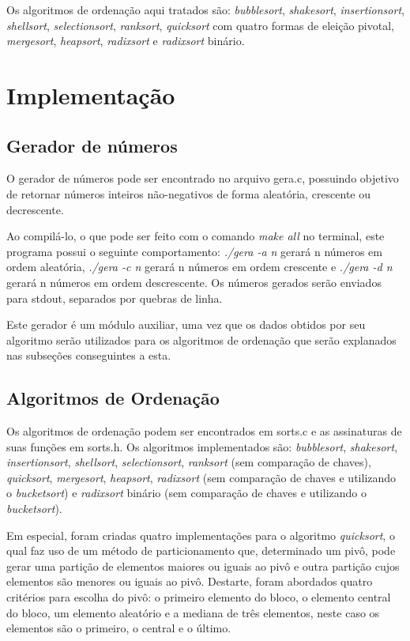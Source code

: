 \documentclass[
	article,			%
	11pt,				%
	oneside,			%
	a4paper,			%
	english,			%
	brazil,				%
	sumario=tradicional
	]{abntex2}
\begin{document}
Os algoritmos de ordenação aqui tratados são: \emph{bubblesort}, \emph{shakesort}, \emph{insertionsort}, \emph{shellsort}, \emph{selectionsort}, \emph{ranksort}, \emph{quicksort} com quatro formas de eleição pivotal, \emph{mergesort}, \emph{heapsort}, \emph{radixsort} e \emph{radixsort} binário.

\section{Implementação}

\subsection{Gerador de números}

O gerador de números pode ser encontrado no arquivo gera.c, possuindo objetivo de retornar números inteiros não-negativos de forma aleatória, crescente ou decrescente.

Ao compilá-lo, o que pode ser feito com o comando \emph{make all} no terminal, este programa possui o seguinte comportamento: \emph{./gera -a n} gerará n números em ordem aleatória, \emph{./gera -c n} gerará n números em ordem crescente e \emph{./gera -d n} gerará n números em ordem descrescente. Os números gerados serão enviados para stdout, separados por quebras de linha.

Este gerador é um módulo auxiliar, uma vez que os dados obtidos por seu algoritmo serão utilizados para os algoritmos de ordenação que serão explanados nas subseções conseguintes a esta.

\subsection{Algoritmos de Ordenação}

Os algoritmos de ordenação podem ser encontrados em sorts.c e as assinaturas de suas funções em sorts.h. Os algoritmos implementados são: \emph{bubblesort}, \emph{shakesort}, \emph{insertionsort}, \emph{shellsort}, \emph{selectionsort}, \emph{ranksort} (sem comparação de chaves), \emph{quicksort}, \emph{mergesort}, \emph{heapsort}, \emph{radixsort} (sem comparação de chaves e utilizando o \emph{bucketsort}) e \emph{radixsort} binário (sem comparação de chaves e utilizando o \emph{bucketsort}).

Em especial, foram criadas quatro implementações para o algoritmo \emph{quicksort}, o qual faz uso de um método de particionamento que, determinado um pivô, pode gerar uma partição de elementos maiores ou iguais ao pivô e outra partição cujos elementos são menores ou iguais ao pivô. Destarte, foram abordados quatro critérios para escolha do pivô: o primeiro elemento do bloco, o elemento central do bloco, um elemento aleatório e a mediana de três elementos, neste caso os elementos são o primeiro, o central e o último.
\end{document}
